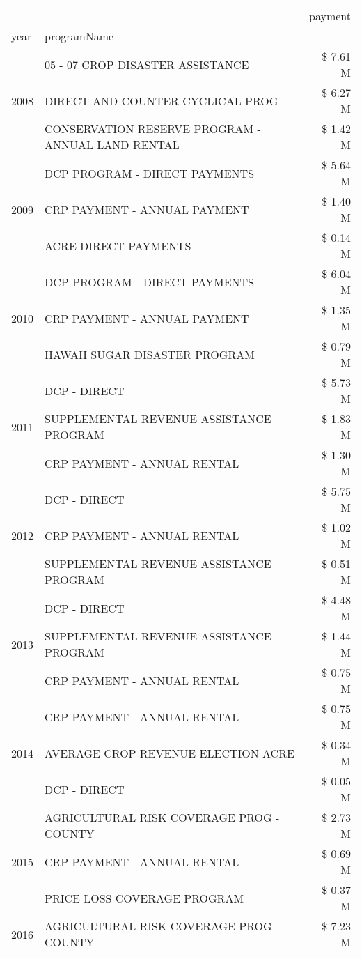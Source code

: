 \begin{tabular}{llr}
\toprule
 &  & payment \\
year & programName &  \\
\midrule
\multirow[t]{3}{*}{2008} & 05 - 07 CROP DISASTER ASSISTANCE & \$ 7.61 M \\
 & DIRECT AND COUNTER CYCLICAL PROG & \$ 6.27 M \\
 & CONSERVATION RESERVE PROGRAM - ANNUAL LAND RENTAL & \$ 1.42 M \\
\cline{1-3}
\multirow[t]{3}{*}{2009} & DCP PROGRAM - DIRECT PAYMENTS & \$ 5.64 M \\
 & CRP PAYMENT - ANNUAL PAYMENT & \$ 1.40 M \\
 & ACRE DIRECT PAYMENTS & \$ 0.14 M \\
\cline{1-3}
\multirow[t]{3}{*}{2010} & DCP PROGRAM - DIRECT PAYMENTS & \$ 6.04 M \\
 & CRP PAYMENT - ANNUAL PAYMENT & \$ 1.35 M \\
 & HAWAII SUGAR DISASTER PROGRAM & \$ 0.79 M \\
\cline{1-3}
\multirow[t]{3}{*}{2011} & DCP - DIRECT & \$ 5.73 M \\
 & SUPPLEMENTAL REVENUE ASSISTANCE PROGRAM & \$ 1.83 M \\
 & CRP PAYMENT - ANNUAL RENTAL & \$ 1.30 M \\
\cline{1-3}
\multirow[t]{3}{*}{2012} & DCP - DIRECT & \$ 5.75 M \\
 & CRP PAYMENT - ANNUAL RENTAL & \$ 1.02 M \\
 & SUPPLEMENTAL REVENUE ASSISTANCE PROGRAM & \$ 0.51 M \\
\cline{1-3}
\multirow[t]{3}{*}{2013} & DCP - DIRECT & \$ 4.48 M \\
 & SUPPLEMENTAL REVENUE ASSISTANCE PROGRAM & \$ 1.44 M \\
 & CRP PAYMENT - ANNUAL RENTAL & \$ 0.75 M \\
\cline{1-3}
\multirow[t]{3}{*}{2014} & CRP PAYMENT - ANNUAL RENTAL & \$ 0.75 M \\
 & AVERAGE CROP REVENUE ELECTION-ACRE & \$ 0.34 M \\
 & DCP - DIRECT & \$ 0.05 M \\
\cline{1-3}
\multirow[t]{3}{*}{2015} & AGRICULTURAL RISK COVERAGE PROG - COUNTY & \$ 2.73 M \\
 & CRP PAYMENT - ANNUAL RENTAL & \$ 0.69 M \\
 & PRICE LOSS COVERAGE PROGRAM & \$ 0.37 M \\
\cline{1-3}
\multirow[t]{3}{*}{2016} & AGRICULTURAL RISK COVERAGE PROG - COUNTY & \$ 7.23 M \\

\end{tabular}
